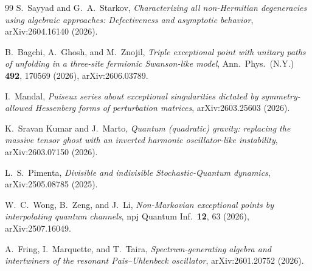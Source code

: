 ﻿\documentclass[11pt]{article}
\theoremstyle{remark}
\begin{document}
\begin{thebibliography}{99}
S.~Sayyad and G.~A.~Starkov,
\emph{Characterizing all non-Hermitian degeneracies using algebraic
approaches: Defectiveness and asymptotic behavior},
arXiv:2604.16140 (2026).

B.~Bagchi, A.~Ghosh, and M.~Znojil,
\emph{Triple exceptional point with unitary paths of unfolding in a
three-site fermionic Swanson-like model},
Ann.\ Phys.\ (N.Y.) \textbf{492}, 170569 (2026), arXiv:2606.03789.

I.~Mandal,
\emph{Puiseux series about exceptional singularities dictated by
symmetry-allowed Hessenberg forms of perturbation matrices},
arXiv:2603.25603 (2026).

K.~Sravan Kumar and J.~Marto,
\emph{Quantum (quadratic) gravity: replacing the massive tensor
ghost with an inverted harmonic oscillator-like instability},
arXiv:2603.07150 (2026).

L.~S.~Pimenta,
\emph{Divisible and indivisible Stochastic-Quantum dynamics},
arXiv:2505.08785 (2025).

W.~C.~Wong, B.~Zeng, and J.~Li,
\emph{Non-Markovian exceptional points by interpolating quantum
channels},
npj Quantum Inf.\ \textbf{12}, 63 (2026), arXiv:2507.16049.

A.~Fring, I.~Marquette, and T.~Taira,
\emph{Spectrum-generating algebra and intertwiners of the resonant
Pais--Uhlenbeck oscillator}, arXiv:2601.20752 (2026).

\end{thebibliography}
\end{document}
